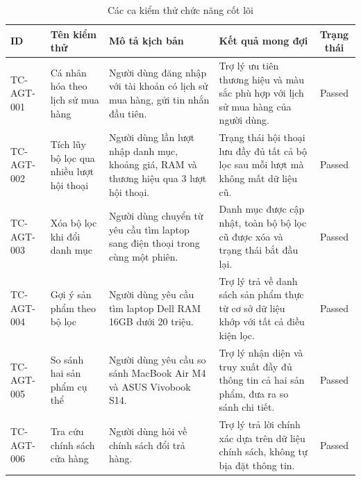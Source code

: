 \begin{table}[H]
\centering
\caption{Các ca kiểm thử chức năng cốt lõi}
\label{tab:tc_agent_core}
\small
\begin{tabularx}{\textwidth}{|l|X|X|X|c|}
\hline
\textbf{ID} & \textbf{Tên kiểm thử} & \textbf{Mô tả kịch bản} & \textbf{Kết quả mong đợi} & \textbf{Trạng thái} \\ \hline
TC-AGT-001 & Cá nhân hóa theo lịch sử mua hàng & Người dùng đăng nhập với tài khoản có lịch sử mua hàng, gửi tin nhắn đầu tiên. & Trợ lý ưu tiên thương hiệu và màu sắc phù hợp với lịch sử mua hàng của người dùng. & Passed \\ \hline
TC-AGT-002 & Tích lũy bộ lọc qua nhiều lượt hội thoại & Người dùng lần lượt nhập danh mục, khoảng giá, RAM và thương hiệu qua 3 lượt hội thoại. & Trạng thái hội thoại lưu đầy đủ tất cả bộ lọc sau mỗi lượt mà không mất dữ liệu cũ. & Passed \\ \hline
TC-AGT-003 & Xóa bộ lọc khi đổi danh mục & Người dùng chuyển từ yêu cầu tìm laptop sang điện thoại trong cùng một phiên. & Danh mục được cập nhật, toàn bộ bộ lọc cũ được xóa và trạng thái bắt đầu lại. & Passed \\ \hline
TC-AGT-004 & Gợi ý sản phẩm theo bộ lọc & Người dùng yêu cầu tìm laptop Dell RAM 16GB dưới 20 triệu. & Trợ lý trả về danh sách sản phẩm thực từ cơ sở dữ liệu khớp với tất cả điều kiện lọc. & Passed \\ \hline
TC-AGT-005 & So sánh hai sản phẩm cụ thể & Người dùng yêu cầu so sánh MacBook Air M4 và ASUS Vivobook S14. & Trợ lý nhận diện và truy xuất đầy đủ thông tin cả hai sản phẩm, đưa ra so sánh chi tiết. & Passed \\ \hline
TC-AGT-006 & Tra cứu chính sách cửa hàng & Người dùng hỏi về chính sách đổi trả hàng. & Trợ lý trả lời chính xác dựa trên dữ liệu chính sách, không tự bịa đặt thông tin. & Passed \\ \hline
\end{tabularx}
\end{table}


